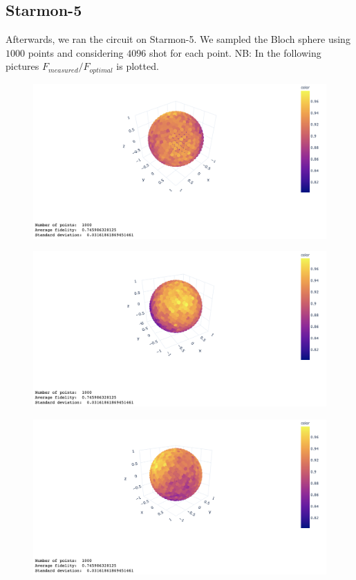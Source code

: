 \documentclass[11p]{article}
\begin{document}
\subsection*{Starmon-5}
Afterwards, we ran the circuit on Starmon-5. We sampled the Bloch sphere using $1000$ points and considering $4096$ shot for each point. 
NB: In the following pictures $F_{measured}/F_{optimal}$ is plotted.
\begin{figure}[H]
    \centering
            \includegraphics[totalheight=6cm]{Figures/starmon(1,1)_F.png}
        \label{fig:2a}
\end{figure}
\begin{figure}[H]
    \centering
            \includegraphics[totalheight=6cm]{Figures/starmon(-1,-1)_F.png}
        \label{fig:2a}
\end{figure}
\begin{figure}[H]
    \centering
            \includegraphics[totalheight=6cm]{Figures/starmon(1,-1)_F.png}
        \label{fig:2a}
\end{figure}
\end{document}
